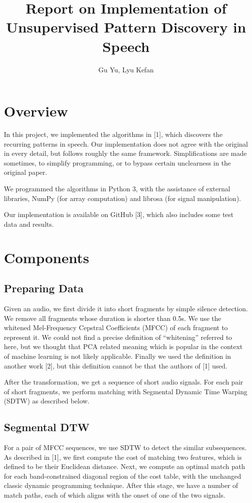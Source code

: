 \documentclass{article}
\title{Report on Implementation of Unsupervised Pattern Discovery in Speech}
\author{Gu Yu, Lyu Kefan}
\begin{document}
\maketitle

\section{Overview}
    In this project, we implemented the algorithms in [1], which discovers the recurring patterns
    in speech. Our implementation does not agree with the original in every detail, but follows 
    roughly the same framework. Simplifications are made sometimes, to simplify programming, or to bypass
    certain unclearness in the original paper.

    We programmed the algorithms in Python 3, with the assistance of external libraries, NumPy 
    (for array computation) and librosa (for signal manipulation).

    Our implementation is available on GitHub [3], which also includes some test data and results.

\section{Components}
    \subsection{Preparing Data}
        Given an audio, we first divide it into short fragments by simple silence detection. We 
        remove all fragments whose duration is shorter than 0.5s. We use the whitened
        Mel-Frequency Cepstral Coefficients (MFCC) of each fragment to represent it.
        We could not find a precise definition of ``whitening'' referred to here, but we thought that
        PCA related meaning which is popular in the context of machine learning is not likely applicable.
        Finally we used the definition in another work [2], but this definition cannot be that the 
        authors of [1] used.   
        
        After the transformation, we get a sequence of short audio signals. For each pair of 
        short fragments, we perform matching with Segmental Dynamic Time Warping (SDTW) as described below.

    \subsection{Segmental DTW}
        For a pair of MFCC sequences, we use SDTW to detect the similar subsequences. As described in [1],
        we first compute the cost of matching two features, which is defined to be their Euclidean distance.
        Next, we compute an optimal match path for each band-constrained diagonal region of the cost table, 
        with the unchanged classic dynamic programming technique. After this stage, we have a number of 
        match paths, each of which aligns with the onset of one of the two signals.
\end{document}
